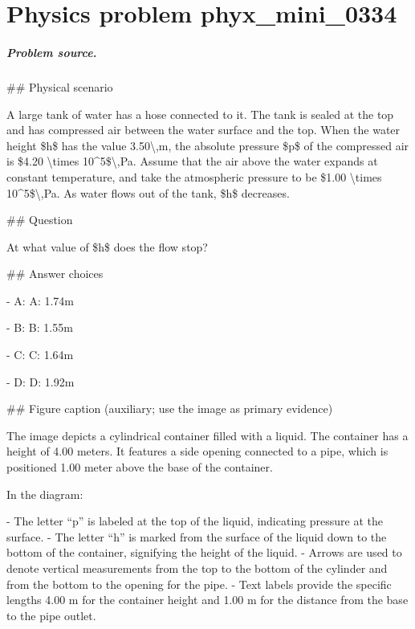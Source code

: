 
\chapter{Physics problem phyx\_mini\_0334}
\label{ch:PhyXMiniProblems_problem_phyx_mini_0334}

\paragraph{Problem source.}
\#\# Physical scenario

A large tank of water has a hose connected to it. The tank is sealed at the top and has compressed air between the water surface and the top. When the water height \$h\$ has the value 3.50\textbackslash{},m, the absolute pressure \$p\$ of the compressed air is \$4.20 \textbackslash{}times 10\textasciicircum{}5\$\textbackslash{},Pa. Assume that the air above the water expands at constant temperature, and take the atmospheric pressure to be \$1.00 \textbackslash{}times 10\textasciicircum{}5\$\textbackslash{},Pa. As water flows out of the tank, \$h\$ decreases.

\#\# Question

At what value of \$h\$ does the flow stop?

\#\# Answer choices

- A: A: 1.74m

- B: B: 1.55m

- C: C: 1.64m

- D: D: 1.92m

\#\# Figure caption (auxiliary; use the image as primary evidence)

The image depicts a cylindrical container filled with a liquid. The container has a height of 4.00 meters. It features a side opening connected to a pipe, which is positioned 1.00 meter above the base of the container. 

In the diagram:

- The letter “p” is labeled at the top of the liquid, indicating pressure at the surface.
- The letter “h” is marked from the surface of the liquid down to the bottom of the container, signifying the height of the liquid.
- Arrows are used to denote vertical measurements from the top to the bottom of the cylinder and from the bottom to the opening for the pipe.
- Text labels provide the specific lengths 4.00 m for the container height and 1.00 m for the distance from the base to the pipe outlet.

